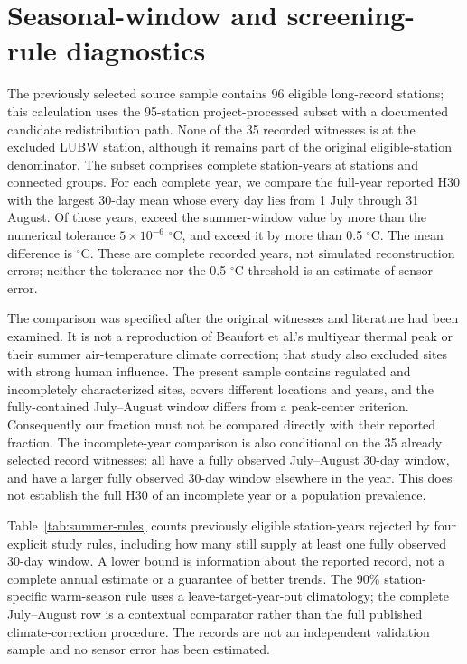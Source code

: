 \section{Seasonal-window and screening-rule diagnostics}
The previously selected source sample contains 96 eligible long-record stations; this calculation uses the 95-station project-processed subset with a documented candidate redistribution path. None of the 35 recorded witnesses is at the excluded LUBW station, although it remains part of the original eligible-station denominator. The subset comprises \SWComplete{} complete station-years at \SWStations{} stations and \SWGroups{} connected groups. For each complete year, we compare the full-year reported H30 with the largest 30-day mean whose every day lies from 1 July through 31 August. Of those years, \SWAbove{} exceed the summer-window value by more than the numerical tolerance $5\times10^{-6}$ $^{\circ}$C, and \SWAboveHalf{} exceed it by more than 0.5 $^{\circ}$C. The mean difference is \SWMean{} $^{\circ}$C. These are complete recorded years, not simulated reconstruction errors; neither the tolerance nor the 0.5 $^{\circ}$C threshold is an estimate of sensor error.

The comparison was specified after the original witnesses and literature had been examined. It is not a reproduction of Beaufort et al.'s multiyear thermal peak or their summer air-temperature climate correction; that study also excluded sites with strong human influence. The present sample contains regulated and incompletely characterized sites, covers different locations and years, and the fully-contained July--August window differs from a peak-center criterion. Consequently our fraction must not be compared directly with their reported fraction. The incomplete-year comparison is also conditional on the 35 already selected record witnesses: all have a fully observed July--August 30-day window, and \SWWitness{} have a larger fully observed 30-day window elsewhere in the year. This does not establish the full H30 of an incomplete year or a population prevalence.

Table~\ref{tab:summer-rules} counts previously eligible station-years rejected by four explicit study rules, including how many still supply at least one fully observed 30-day window. A lower bound is information about the reported record, not a complete annual estimate or a guarantee of better trends. The 90\% station-specific warm-season rule uses a leave-target-year-out climatology; the complete July--August row is a contextual comparator rather than the full published climate-correction procedure. The records are not an independent validation sample and no sensor error has been estimated.


